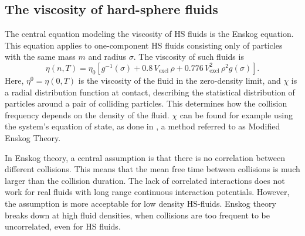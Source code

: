 \subsection{The viscosity of hard-sphere fluids}
The central equation modeling the viscosity of HS fluids is the Enskog equation. 
This equation applies to one-component HS fluids consisting only of particles with the same mass $m$ and radius $\sigma$.
The viscosity of such fluids is \cite{ref:pippo:composition_dependence}
\begin{equation}
    \eta(n,T) 
        = \eta_0 \left[g^{-1}(\sigma) 
        + 0.8   \, V_{\text{excl}}      \,\rho 
        + 0.776 \, V_{\text{excl}}^2    \,\rho^2 g(\sigma) 
        \right].
\end{equation}
Here, $\eta^0 = \eta(0, T)$ is the viscosity of the fluid in the zero-density limit, 
and $\chi$ is a radial distribution function at contact, 
describing the statistical distribution of particles around a pair of colliding particles.
This determines how the collision frequency depends on the density of the fluid.
$\chi$ can be found for example using the system's equation of state, 
as done in \cite{ref:pippo:composition_dependence}, a method referred to as Modified Enskog Theory.


In Enskog theory, a central assumption is that there is no correlation between different collisions. 
This means that the mean free time between collisions is much larger than the collision duration. 
The lack of correlated interactions does not work for real fluids with long range continuous interaction potentials. 
However, the assumption is more acceptable for low density HS-fluids. 
Enskog theory breaks down at high fluid densities, when collisions are too frequent to be uncorrelated, even for HS fluids.

